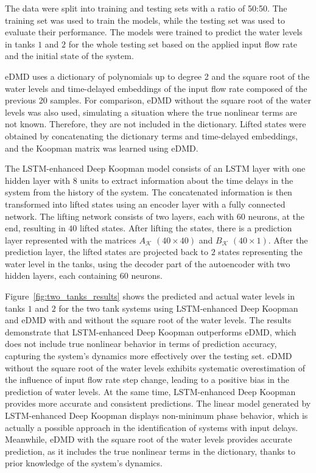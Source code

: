 \documentclass[conference]{IEEEtran}
\begin{document}
The data were split into training and testing sets with a ratio of 50:50. The training set was used to train the models, while the testing set was used to evaluate their performance. The models were trained to predict the water levels in tanks $1$ and $2$ for the whole testing set based on the applied input flow rate and the initial state of the system.

eDMD uses a dictionary of polynomials up to degree 2 and the square root of the water levels and time-delayed embeddings of the input flow rate composed of the previous 20 samples. For comparison, eDMD without the square root of the water levels was also used, simulating a situation where the true nonlinear terms are not known. Therefore, they are not included in the dictionary. Lifted states were obtained by concatenating the dictionary terms and time-delayed embeddings, and the Koopman matrix was learned using eDMD.

The LSTM-enhanced Deep Koopman model consists of an LSTM layer with one hidden layer with $8$ units to extract information about the time delays in the system from the history of the system. The concatenated information is then transformed into lifted states using an encoder layer with a fully connected network. The lifting network consists of two layers, each with $60$ neurons, at the end, resulting in $40$ lifted states. After lifting the states, there is a prediction layer represented with the matrices $A_\mathcal{K}$ $\left(40 \times 40\right)$ and $B_\mathcal{K}$ $\left(40 \times 1\right)$. After the prediction layer, the lifted states are projected back to $2$ states representing the water level in the tanks, using the decoder part of the autoencoder with two hidden layers, each containing $60$ neurons.

Figure~\ref{fig:two_tanks_results} shows the predicted and actual water levels in tanks $1$ and $2$ for the two tank systems using LSTM-enhanced Deep Koopman and eDMD with and without the square root of the water levels. The results demonstrate that LSTM-enhanced Deep Koopman outperforms eDMD, which does not include true nonlinear behavior in terms of prediction accuracy, capturing the system's dynamics more effectively over the testing set. eDMD without the square root of the water levels exhibits systematic overestimation of the influence of input flow rate step change, leading to a positive bias in the prediction of water levels. At the same time, LSTM-enhanced Deep Koopman provides more accurate and consistent predictions. The linear model generated by LSTM-enhanced Deep Koopman displays non-minimum phase behavior, which is actually a possible approach in the identification of systems with input delays. Meanwhile, eDMD with the square root of the water levels provides accurate prediction, as it includes the true nonlinear terms in the dictionary, thanks to prior knowledge of the system's dynamics.
\end{document}
